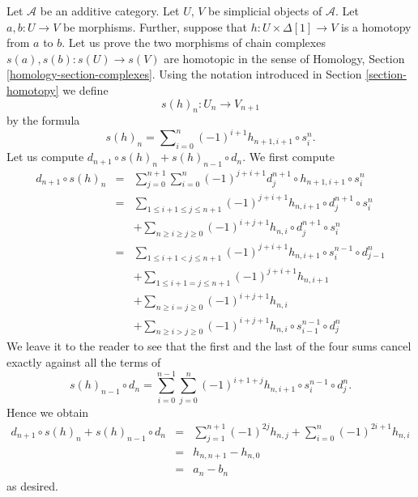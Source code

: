 \noindent
Let $\mathcal{A}$ be an additive category. Let $U$, $V$ be simplicial objects
of $\mathcal{A}$. Let $a, b : U \to V$ be morphisms. Further, suppose that
$h : U \times \Delta[1] \to V$ is a homotopy from $a$ to $b$. Let us prove
the two morphisms of chain complexes $s(a), s(b) : s(U) \longrightarrow s(V)$
are homotopic in the sense of
Homology, Section \ref{homology-section-complexes}.
Using the notation introduced in Section \ref{section-homotopy}
we define
$$
s(h)_n : U_n \longrightarrow V_{n + 1}
$$
by the formula
\begin{equation}
\label{equation-homotopy-to-homotopy}
s(h)_n = \sum\nolimits_{i = 0}^n (-1)^{i + 1} h_{n + 1, i + 1} \circ s^n_i.
\end{equation}
Let us compute $d_{n + 1} \circ s(h)_n + s(h)_{n - 1} \circ d_n$.
We first compute
\begin{eqnarray*}
d_{n + 1} \circ s(h)_n & = &
\sum\nolimits_{j = 0}^{n + 1}
\sum\nolimits_{i = 0}^n
(-1)^{j + i + 1}
d^{n + 1}_j \circ h_{n + 1, i + 1} \circ s^n_i \\
& = &
\sum\nolimits_{1 \leq i + 1 \leq j \leq n + 1}
(-1)^{j + i + 1}
h_{n, i + 1} \circ d^{n + 1}_j \circ s^n_i \\
& &
+
\sum\nolimits_{n \geq i \geq j \geq 0}
(-1)^{i + j + 1}
h_{n, i} \circ d^{n + 1}_j \circ s^n_i \\
& = &
\sum\nolimits_{1 \leq i + 1 < j \leq n + 1}
(-1)^{j + i + 1}
h_{n, i + 1} \circ s^{n - 1}_i \circ d^n_{j - 1} \\
& &
+
\sum\nolimits_{1 \leq i + 1 = j \leq n + 1}
(-1)^{j + i + 1}
h_{n, i + 1} \\
& &
+
\sum\nolimits_{n \geq i = j \geq 0}
(-1)^{i + j + 1}
h_{n, i} \\
& &
+
\sum\nolimits_{n \geq i > j \geq 0}
(-1)^{i + j + 1}
h_{n, i} \circ s^{n - 1}_{i - 1} \circ d^n_j
\end{eqnarray*}
We leave it to the reader to see that the first and the last
of the four sums cancel exactly against all the terms of
$$
s(h)_{n - 1} \circ d_n
=
\sum_{i = 0}^{n - 1} \sum_{j = 0}^n
(-1)^{i + 1 + j} h_{n, i + 1} \circ s^{n - 1}_i \circ d^n_j.
$$
Hence we obtain
\begin{eqnarray*}
d_{n + 1} \circ s(h)_n + s(h)_{n - 1} \circ d_n
& = &
\sum_{j = 1}^{n + 1} (-1)^{2j} h_{n, j}
+
\sum_{i = 0}^n (-1)^{2i + 1} h_{n, i} \\
& = &
h_{n, n + 1} - h_{n , 0} \\
& = &
a_n - b_n
\end{eqnarray*}
as desired.

